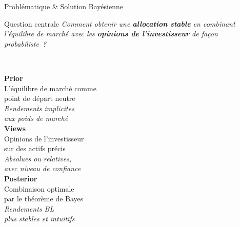 \documentclass[aspectratio=169, 10pt, t]{beamer}
\begin{document}
\begin{frame}[t,shrink=8]{Problématique \& Solution Bayésienne}
  \begin{exampleblock}{Question centrale}
    \centering\large
    \textit{Comment obtenir une \textbf{allocation stable} en combinant
    l'équilibre de marché avec les \textbf{opinions de l'investisseur}
    de façon probabiliste~?}
  \end{exampleblock}

  \vspace{0.2em}
  \begin{columns}[t]
      \centering
      {\Large\textcolor{MainBlue}{\faBalanceScale}}\\[6pt]
      \textbf{Prior}\\[4pt]
      {\footnotesize L'équilibre de marché comme\\ point de départ neutre\\[4pt]
      \textit{Rendements implicites\\ aux poids de marché}}
      \centering
      {\Large\textcolor{AccentBlue}{\faEye}}\\[6pt]
      \textbf{Views}\\[4pt]
      {\footnotesize Opinions de l'investisseur\\ sur des actifs précis\\[4pt]
      \textit{Absolues ou relatives,\\ avec niveau de confiance}}
      \centering
      {\Large\textcolor{SuccessGreen}{\faStar}}\\[6pt]
      \textbf{Posterior}\\[4pt]
      {\footnotesize Combinaison optimale\\ par le théorème de Bayes\\[4pt]
      \textit{Rendements BL\\ plus stables et intuitifs}}
  \end{columns}


\end{frame}
\end{document}
